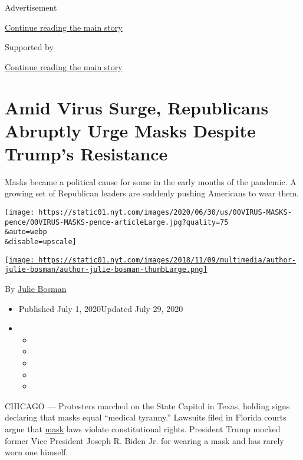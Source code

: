 Advertisement

\protect\hyperlink{after-top}{Continue reading the main story}

Supported by

\protect\hyperlink{after-sponsor}{Continue reading the main story}

\hypertarget{amid-virus-surge-republicans-abruptly-urge-masks-despite-trumps-resistance}{%
\section{Amid Virus Surge, Republicans Abruptly Urge Masks Despite
Trump's
Resistance}\label{amid-virus-surge-republicans-abruptly-urge-masks-despite-trumps-resistance}}

Masks became a political cause for some in the early months of the
pandemic. A growing set of Republican leaders are suddenly pushing
Americans to wear them.

\texttt{[image: https://static01.nyt.com/images/2020/06/30/us/00VIRUS-MASKS-pence/00VIRUS-MASKS-pence-articleLarge.jpg?quality=75\\\&auto=webp\\\&disable=upscale]}

\href{https://www.nytimes.com/by/julie-bosman}{\texttt{[image: https://static01.nyt.com/images/2018/11/09/multimedia/author-julie-bosman/author-julie-bosman-thumbLarge.png]}}

By \href{https://www.nytimes.com/by/julie-bosman}{Julie Bosman}

\begin{itemize}
\item
  Published July 1, 2020Updated July 29, 2020
\item
  \begin{itemize}
  \item
  \item
  \item
  \item
  \item
  \end{itemize}
\end{itemize}

CHICAGO --- Protesters marched on the State Capitol in Texas, holding
signs declaring that masks equal ``medical tyranny.'' Lawsuits filed in
Florida courts argue that
\href{https://www.nytimes.com/2020/07/29/us/politics/louie-gohmert-positive-coronavirus-mask.html}{mask}
laws violate constitutional rights. President Trump mocked former Vice
President Joseph R. Biden Jr. for wearing a mask and has rarely worn one
himself.

